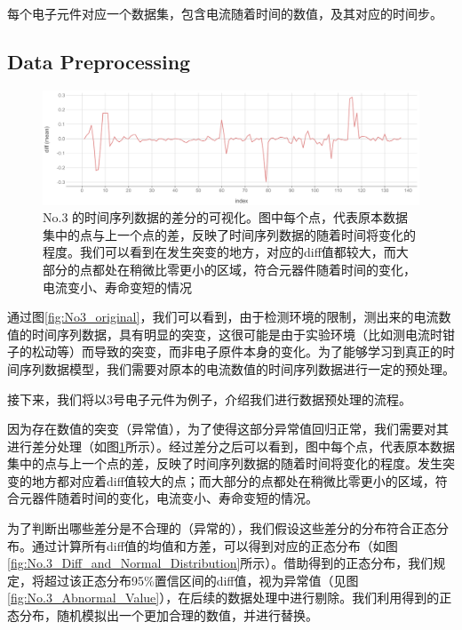 每个电子元件对应一个数据集，包含电流随着时间的数值，及其对应的时间步。


\subsection{Data Preprocessing}

\begin{figure}[H]
	\centering
	\includegraphics[width=\linewidth]{figures/No.3diff} 
	\caption{No.3 的时间序列数据的差分的可视化。图中每个点，代表原本数据集中的点与上一个点的差，反映了时间序列数据的随着时间将变化的程度。我们可以看到在发生突变的地方，对应的diff值都较大，而大部分的点都处在稍微比零更小的区域，符合元器件随着时间的变化，电流变小、寿命变短的情况}
	\label{fig:No3_diff}
	
\end{figure}


通过图\ref{fig:No3_original}，我们可以看到，由于检测环境的限制，测出来的电流数值的时间序列数据，具有明显的突变，这很可能是由于实验环境（比如测电流时钳子的松动等）而导致的突变，而非电子原件本身的变化。为了能够学习到真正的时间序列数据模型，我们需要对原本的电流数值的时间序列数据进行一定的预处理。


接下来，我们将以3号电子元件为例子，介绍我们进行数据预处理的流程。

因为存在数值的突变（异常值），为了使得这部分异常值回归正常，我们需要对其进行差分处理（如图\ref{fig:No3_diff}所示）。经过差分之后可以看到，图中每个点，代表原本数据集中的点与上一个点的差，反映了时间序列数据的随着时间将变化的程度。发生突变的地方都对应着diff值较大的点；而大部分的点都处在稍微比零更小的区域，符合元器件随着时间的变化，电流变小、寿命变短的情况。

为了判断出哪些差分是不合理的（异常的），我们假设这些差分的分布符合正态分布。通过计算所有diff值的均值和方差，可以得到对应的正态分布（如图\ref{fig:No.3_Diff_and_Normal_Distribution}所示）。借助得到的正态分布，我们规定，将超过该正态分布95\%置信区间的diff值，视为异常值（见图\ref{fig:No.3_Abnormal_Value}），在后续的数据处理中进行剔除。我们利用得到的正态分布，随机模拟出一个更加合理的数值，并进行替换。

